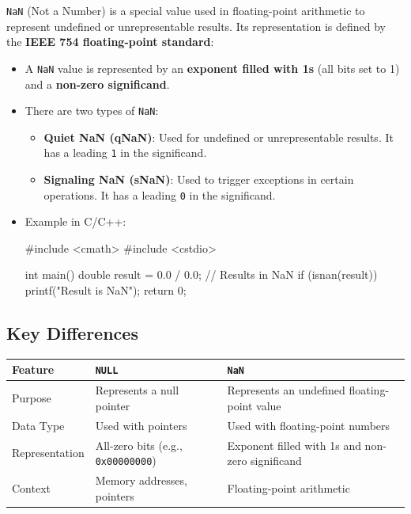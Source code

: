 \texttt{NaN} (Not a Number) is a special value used in floating-point arithmetic to represent undefined or unrepresentable results. Its representation is defined by the \textbf{IEEE 754 floating-point standard}:

\begin{itemize}
    \item A \texttt{NaN} value is represented by an \textbf{exponent filled with 1s} (all bits set to 1) and a \textbf{non-zero significand}.
    \item There are two types of \texttt{NaN}:
    \begin{itemize}
        \item \textbf{Quiet NaN (qNaN)}: Used for undefined or unrepresentable results. It has a leading \texttt{1} in the significand.
        \item \textbf{Signaling NaN (sNaN)}: Used to trigger exceptions in certain operations. It has a leading \texttt{0} in the significand.
    \end{itemize}
    \item Example in C/C++:
\begin{exampleblock}
    \begin{codeblock}[language=C++]
#include <cmath>
#include <cstdio>

int main() {
    double result = 0.0 / 0.0; // Results in NaN
    if (isnan(result)) {
        printf("Result is NaN\n");
    }
    return 0;
}
    \end{codeblock}
\end{exampleblock}

\end{itemize}

\subsection{Key Differences}

\begin{tabular}{|l|l|l|}
    \hline
    \textbf{Feature} & \textbf{\texttt{NULL}} & \textbf{\texttt{NaN}} \\ \hline
    Purpose & Represents a null pointer & Represents an undefined floating-point value \\ \hline
    Data Type & Used with pointers & Used with floating-point numbers \\ \hline
    Representation & All-zero bits (e.g., \texttt{0x00000000}) & Exponent filled with 1s and non-zero significand \\ \hline
    Context & Memory addresses, pointers & Floating-point arithmetic \\ \hline
\end{tabular}

